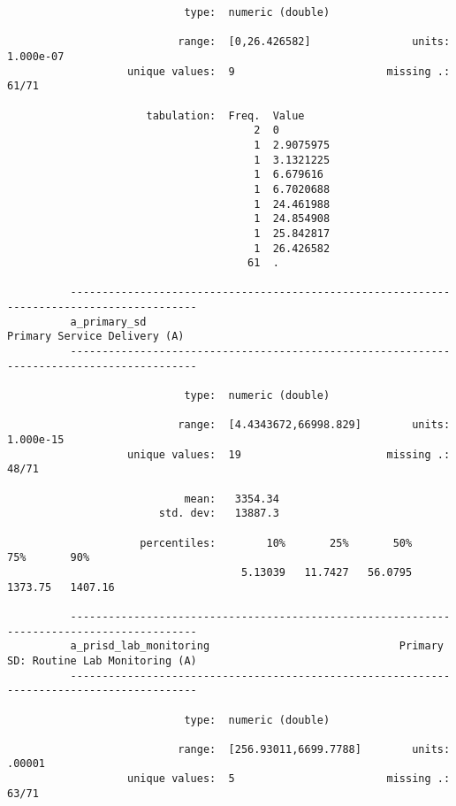 \documentclass{article}
\begin{document}
\begin{verbatim}
                            type:  numeric (double)
          
                           range:  [0,26.426582]                units:  1.000e-07
                   unique values:  9                        missing .:  61/71
          
                      tabulation:  Freq.  Value
                                       2  0
                                       1  2.9075975
                                       1  3.1321225
                                       1  6.679616
                                       1  6.7020688
                                       1  24.461988
                                       1  24.854908
                                       1  25.842817
                                       1  26.426582
                                      61  .
          
          ------------------------------------------------------------------------------------------
          a_primary_sd                                                  Primary Service Delivery (A)
          ------------------------------------------------------------------------------------------
          
                            type:  numeric (double)
          
                           range:  [4.4343672,66998.829]        units:  1.000e-15
                   unique values:  19                       missing .:  48/71
          
                            mean:   3354.34
                        std. dev:   13887.3
          
                     percentiles:        10%       25%       50%       75%       90%
                                     5.13039   11.7427   56.0795   1373.75   1407.16
          
          ------------------------------------------------------------------------------------------
          a_prisd_lab_monitoring                              Primary SD: Routine Lab Monitoring (A)
          ------------------------------------------------------------------------------------------
          
                            type:  numeric (double)
          
                           range:  [256.93011,6699.7788]        units:  .00001
                   unique values:  5                        missing .:  63/71
          

\end{verbatim}
\end{document}
